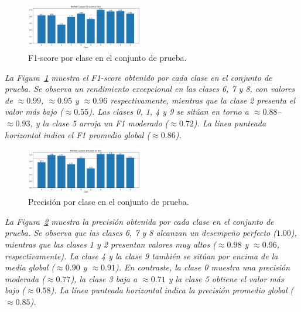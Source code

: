 \documentclass[conference]{IEEEtran}
\begin{document}
\begin{figure}[H]
    \centering
    \includegraphics[width=0.45\textwidth]{graphics-resnet-raw/resnet_raw_without_class_f1.png}
    \caption{F1-score por clase en el conjunto de prueba.}
    \label{fig:resnet_raw_without_class_f1}
\end{figure}
\noindent\textit{%
La Figura~\ref{fig:resnet_raw_without_class_f1} muestra el F1-score obtenido por cada clase en el conjunto de prueba. Se observa un rendimiento excepcional en las clases 6, 7 y 8, con valores de \(\approx0.99\), \(\approx0.95\) y \(\approx0.96\) respectivamente, mientras que la clase 2 presenta el valor más bajo (\(\approx0.55\)). Las clases 0, 1, 4 y 9 se sitúan en torno a \(\approx0.88\)–\(\approx0.93\), y la clase 5 arroja un F1 moderado (\(\approx0.72\)). La línea punteada horizontal indica el F1 promedio global (\(\approx0.86\)).
}

\begin{figure}[H]
    \centering
    \includegraphics[width=0.45\textwidth]{graphics-resnet-raw/resnet_raw_without_class_precision.png}
    \caption{Precisión por clase en el conjunto de prueba.}
    \label{fig:resnet_raw_without_class_precision}
\end{figure}
\noindent\textit{%
La Figura~\ref{fig:resnet_raw_without_class_precision} muestra la precisión obtenida por cada clase en el conjunto de prueba. Se observa que las clases 6, 7 y 8 alcanzan un desempeño perfecto (\(1.00\)), mientras que las clases 1 y 2 presentan valores muy altos (\(\approx0.98\) y \(\approx0.96\), respectivamente). La clase 4 y la clase 9 también se sitúan por encima de la media global (\(\approx0.90\) y \(\approx0.91\)). En contraste, la clase 0 muestra una precisión moderada (\(\approx0.77\)), la clase 3 baja a \(\approx0.71\) y la clase 5 obtiene el valor más bajo (\(\approx0.58\)). La línea punteada horizontal indica la precisión promedio global (\(\approx0.85\)).
}
\end{document}
